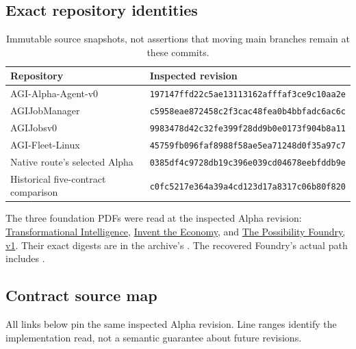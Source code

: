 \subsection{Exact repository identities}
\begin{table}[H]\footnotesize\renewcommand{\arraystretch}{1.2}
\begin{tabular}{@{}ll@{}}\toprule
Repository & Inspected revision\\\midrule
AGI-Alpha-Agent-v0 & \texttt{197147ffd22c5ae13113162afffaf3ce9c10aa2e}\\
AGIJobManager & \texttt{c5958eae872458c2f3cac48fea0b4bbfadc6ac6c}\\
AGIJobsv0 & \texttt{9983478d42c32fe399f28dd9b0e0173f904b8a11}\\
AGI-Fleet-Linux & \texttt{45759fb096faf8988f58ae5ea71248d0f35a97c7}\\
Native route's selected Alpha & \texttt{0385df4c9728db19c396e039cd04678eebfddb9e}\\
Historical five-contract comparison & \texttt{c0fc5217e364a39a4cd123d17a8317c06b80f820}\\\bottomrule
\end{tabular}
\caption{Immutable source snapshots, not assertions that moving main branches remain at these commits.}
\end{table}

The three foundation PDFs were read at the inspected Alpha revision: \href{https://github.com/MontrealAI/AGI-Alpha-Agent-v0/blob/197147ffd22c5ae13113162afffaf3ce9c10aa2e/docs/Transformational_Intelligence.pdf}{Transformational Intelligence}, \href{https://github.com/MontrealAI/AGI-Alpha-Agent-v0/blob/197147ffd22c5ae13113162afffaf3ce9c10aa2e/docs/Invent_the_Economy.pdf}{Invent the Economy}, and \href{https://github.com/MontrealAI/AGI-Alpha-Agent-v0/blob/197147ffd22c5ae13113162afffaf3ce9c10aa2e/docs/papers/possibility-foundry-v1.pdf}{The Possibility Foundry, v1}. Their exact digests are in the archive's . The recovered Foundry's actual path includes .

\subsection{Contract source map}
All links below pin the same inspected Alpha revision. Line ranges identify the implementation read, not a semantic guarantee about future revisions.

